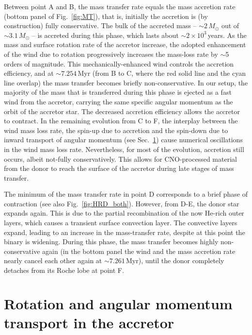 \documentclass[twocolumn,twocolappendix,trackchanges]{aastex63}
\DeclareRobustCommand{\Figref}[1]{Fig.~\ref{#1}}
\DeclareRobustCommand{\Secref}[1]{Sec.~\ref{#1}}
\begin{document}
Between point A and B, the mass transfer rate equals the
mass accretion rate (bottom panel of \Figref{fig:MT}), that is,
initially the accretion is (by construction) fully conservative. The
bulk of the accreted mass -- $\sim{}2\,M_\odot$ out of
$\sim{}3.1\,M_\odot$ -- is accreted during this phase, which
lasts about $\sim{}2\times10^3$\,years. As the mass and surface
rotation rate of the accretor increase, the adopted  
enhancement of the wind due to rotation progressively increases the
mass-loss rate by $\sim$5 orders of magnitude. This
mechanically-enhanced wind controls the accretion efficiency, and at
$\sim{}7.254$\,Myr (from B to C, where the red solid line and the cyan
line overlap) the mass transfer becomes briefly non-conservative. In
our setup, the majority of the mass that is transferred during this phase is
ejected as a fast wind from the accretor, carrying the same specific
angular momentum as the orbit of the accretor star. The decreased
accretion efficiency allows the accretor to contract. In the remaining evolution from C to F,
the interplay between the wind mass loss rate, the spin-up due to
accretion and the spin-down due to inward transport of angular
momentum (see \Secref{sec:rot}) cause numerical oscillations in the wind
mass loss rate. Nevertheless, for most of the evolution, accretion
still occurs, albeit not-fully conservatively. This allows for
CNO-processed material from the donor to reach the surface of the
accretor during late stages of mass transfer.

The minimum of the mass transfer rate in point D corresponds to a
brief phase of contraction (see also \Figref{fig:HRD_both}). However,
from D-E, the donor star expands again.  This is due to the
partial recombination of the now He-rich outer layers, which causes a
transient surface convection layer. The convective layers expand,
leading to an increase in the mass-transfer rate, despite at this
point %
the binary %
is widening. During this phase, the mass transfer becomes highly
non-conservative again (in the bottom panel the wind and the mass
accretion rate nearly cancel each other again at $\sim7.261$\,Myr),
until the donor completely detaches from its Roche lobe at point F.


\section{Rotation and angular momentum transport in the accretor}
\label{sec:rot}
\end{document}
